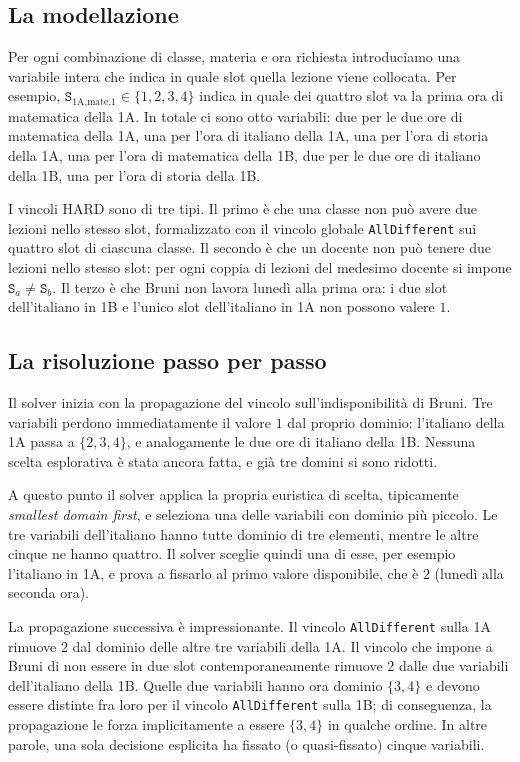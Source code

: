 \subsection{La modellazione}

Per ogni combinazione di classe, materia e ora richiesta
introduciamo una variabile intera che indica in quale slot
quella lezione viene collocata. Per esempio,
$\texttt{S}_{1\text{A,mate,1}} \in \{1, 2, 3, 4\}$ indica
in quale dei quattro slot va la prima ora di matematica
della 1A. In totale ci sono otto variabili: due per le due
ore di matematica della 1A, una per l'ora di italiano della
1A, una per l'ora di storia della 1A, una per l'ora di
matematica della 1B, due per le due ore di italiano della
1B, una per l'ora di storia della 1B.

I vincoli HARD sono di tre tipi. Il primo \`e che una classe
non pu\`o avere due lezioni nello stesso slot, formalizzato
con il vincolo globale \texttt{AllDifferent} sui quattro
slot di ciascuna classe. Il secondo \`e che un docente non
pu\`o tenere due lezioni nello stesso slot: per ogni coppia
di lezioni del medesimo docente si impone $\texttt{S}_a \neq
\texttt{S}_b$. Il terzo \`e che Bruni non lavora luned\`i
alla prima ora: i due slot dell'italiano in 1B e l'unico
slot dell'italiano in 1A non possono valere $1$.

\subsection{La risoluzione passo per passo}

Il solver inizia con la propagazione del vincolo
sull'indisponibilit\`a di Bruni. Tre variabili perdono
immediatamente il valore $1$ dal proprio dominio: l'italiano
della 1A passa a $\{2, 3, 4\}$, e analogamente le due ore di
italiano della 1B. Nessuna scelta esplorativa \`e stata
ancora fatta, e gi\`a tre domini si sono ridotti.

A questo punto il solver applica la propria euristica di
scelta, tipicamente \emph{smallest domain first}, e seleziona
una delle variabili con dominio pi\`u piccolo. Le tre
variabili dell'italiano hanno tutte dominio di tre elementi,
mentre le altre cinque ne hanno quattro. Il solver sceglie
quindi una di esse, per esempio l'italiano in 1A, e prova a
fissarlo al primo valore disponibile, che \`e $2$ (luned\`i
alla seconda ora).

La propagazione successiva \`e impressionante. Il vincolo
\texttt{AllDifferent} sulla 1A rimuove $2$ dal dominio
delle altre tre variabili della 1A. Il vincolo che impone
a Bruni di non essere in due slot contemporaneamente
rimuove $2$ dalle due variabili dell'italiano della 1B.
Quelle due variabili hanno ora dominio $\{3, 4\}$ e devono
essere distinte fra loro per il vincolo \texttt{AllDifferent}
sulla 1B; di conseguenza, la propagazione le forza
implicitamente a essere $\{3, 4\}$ in qualche ordine. In
altre parole, una sola decisione esplicita ha fissato (o
quasi-fissato) cinque variabili.

